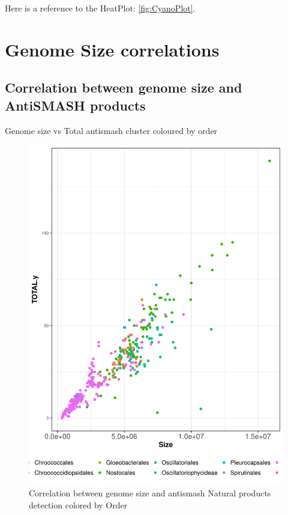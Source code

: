 \documentclass[12pt,twoside]{reedthesis}
\begin{document}
  Here is a reference to the HeatPlot: \autoref{fig:CyanoPlot}.
  \clearpage 
  
  \section{Genome Size correlations}\label{genome-size-correlations-2}
  
  \subsection{Correlation between genome size and AntiSMASH
  products}\label{correlation-between-genome-size-and-antismash-products-2}
  
  Genome size vs Total antismash cluster coloured by order
  
  \begin{figure}[h!tbp]
  \centering
  \includegraphics[angle = 0,scale = 0.6]{chapter2/Cyanobacteria/SMASHvsSizebyOrder.pdf}
  \caption[Correlation between genome size and antismash Natural products detection colored by Order]{\normalsize{Correlation between genome size and antismash Natural products detection colored by Order}}
  \label{fig:SMASHvsSizebyOrder}
  \end{figure}
  
\end{document}
